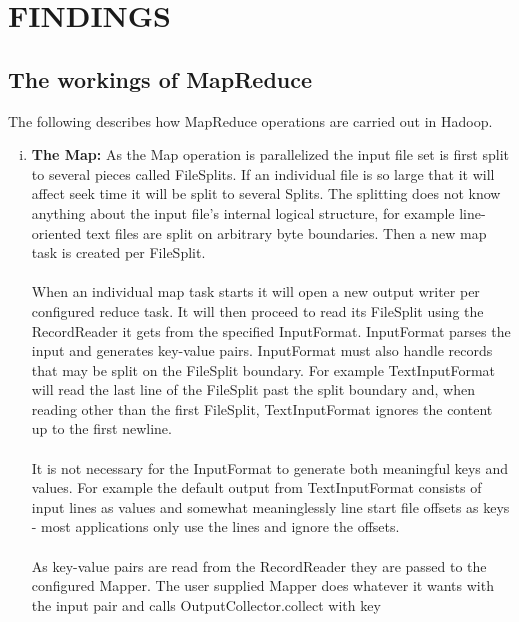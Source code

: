 \documentclass[a4paper,12pt,oneside]{report}
\begin{document}
\newpage
\section{FINDINGS}

\subsection{The workings of MapReduce}

The following describes how MapReduce operations are carried out in Hadoop. 

\begin{enumerate}[(i)]
        \item \textbf{The Map:}
                As the Map operation is parallelized the input file set is first split to several pieces 
                called FileSplits. If an individual file is so large that it will affect seek time it will be split 
                to several Splits. The splitting does not know anything about the input file's internal logical structure, 
                for example line-oriented text files are split on arbitrary byte boundaries. Then a new map task is created per FileSplit.\\ 
                \\
                When an individual map task starts it will open a new output writer per configured reduce task. It will 
                then proceed to read its FileSplit using the RecordReader it gets from the specified InputFormat. InputFormat 
                parses the input and generates key-value pairs. InputFormat must also handle records that may be split on the FileSplit boundary. For example TextInputFormat will read the last line of the FileSplit past the split boundary and, when reading other than the first FileSplit, TextInputFormat ignores the content up to the first newline.\\ 
                \\
                It is not necessary for the InputFormat to generate both meaningful keys and values. For example the 
                default output from TextInputFormat consists of input lines as values and somewhat meaninglessly line 
                start file offsets as keys - most applications only use the lines and ignore the offsets.\\
                \\
                As key-value pairs are read from the RecordReader they are passed to the configured Mapper. The user 
                supplied Mapper does whatever it wants with the input pair and calls OutputCollector.collect with key

\end{enumerate}
\end{document}
